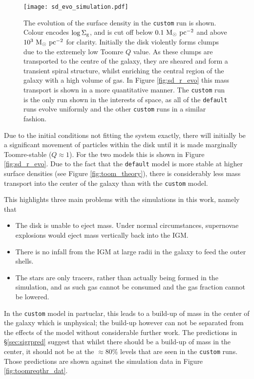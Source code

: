 \begin{figure}[!ht]
    \texttt{[image: sd\_evo\_simulation.pdf]}
    \caption{The evolution of the surface density in the {\tt custom} run is shown. Colour encodes $\log\Sigma_\mathrm{g}$, and is cut off below $0.1 ~\mathrm{M}_{\odot} ~\mathrm{pc}^{-2}$ and above $10^3 ~\mathrm{M}_{\odot} ~\mathrm{pc}^{-2}$ for clarity. Initially the disk violently forms clumps due to the extremely low Toomre $Q$ value. As these clumps are transported to the centre of the galaxy, they are sheared and form a transient spiral structure, whilst enriching the central region of the galaxy with a high volume of gas. In Figure \ref{fig:sd_r_evo} this mass transport is shown in a more quantitative manner. The {\tt custom} run is the only run shown in the interests of space, as all of the {\tt default} runs evolve uniformly and the other {\tt custom} runs in a similar fashion.}
    \label{fig:sd_evo_small}
\end{figure}
Due to the initial conditions not fitting the system exactly, there will initially be a significant movement of particles within the disk until it is made marginally Toomre-stable ($Q\approx1$).
For the two models this is shown in Figure \ref{fig:sd_r_evo}.
Due to the fact that the {\tt default} model is more stable at higher surface densities (see Figure \ref{fig:toom_theory}), there is considerably less mass transport into the center of the galaxy than with the {\tt custom} model.

This highlights three main problems with the simulations in this work, namely that
\begin{itemize}
    \item The disk is unable to eject mass. Under normal circumstances, supernovae explosions would eject mass vertically back into the IGM.
    \item There is no infall from the IGM at large radii in the galaxy to feed the outer shells.
    \item The stars are only tracers, rather than actually being formed in the simulation, and as such gas cannot be consumed and the gas fraction cannot be lowered.
\end{itemize}
In the {\tt custom} model in partuclar, this leads to a build-up of mass in the center of the galaxy which is unphysical; the build-up however can not be separated from the effects of the model without considerable further work.
The predictions in \S \ref{sec:sigrpred} suggest that whilst there should be a build-up of mass in the center, it should not be at the $\approx 80\%$ levels that are seen in the {\tt custom} runs.
Those predictions are shown against the simulation data in Figure \ref{fig:toomreqthr_dat}.

